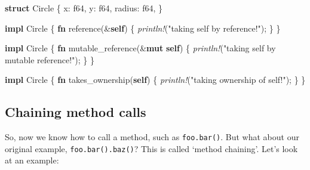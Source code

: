 \documentclass[a4paper,]{book}
\newenvironment{Shaded}{\begin{snugshade}}{\end{snugshade}}
\newcommand{\KeywordTok}[1]{\textcolor[rgb]{0.13,0.29,0.53}{\textbf{{#1}}}}
\newcommand{\DataTypeTok}[1]{\textcolor[rgb]{0.13,0.29,0.53}{{#1}}}
\newcommand{\StringTok}[1]{\textcolor[rgb]{0.31,0.60,0.02}{{#1}}}
\newcommand{\PreprocessorTok}[1]{\textcolor[rgb]{0.56,0.35,0.01}{\textit{{#1}}}}
\newcommand{\NormalTok}[1]{{#1}}
\begin{document}
\begin{Shaded}
\begin{Highlighting}[]
\KeywordTok{struct} \NormalTok{Circle \{}
    \NormalTok{x: }\DataTypeTok{f64}\NormalTok{,}
    \NormalTok{y: }\DataTypeTok{f64}\NormalTok{,}
    \NormalTok{radius: }\DataTypeTok{f64}\NormalTok{,}
\NormalTok{\}}

\KeywordTok{impl} \NormalTok{Circle \{}
    \KeywordTok{fn} \NormalTok{reference(&}\KeywordTok{self}\NormalTok{) \{}
       \PreprocessorTok{println!}\NormalTok{(}\StringTok{"taking self by reference!"}\NormalTok{);}
    \NormalTok{\}}
\NormalTok{\}}

\KeywordTok{impl} \NormalTok{Circle \{}
    \KeywordTok{fn} \NormalTok{mutable_reference(&}\KeywordTok{mut} \KeywordTok{self}\NormalTok{) \{}
       \PreprocessorTok{println!}\NormalTok{(}\StringTok{"taking self by mutable reference!"}\NormalTok{);}
    \NormalTok{\}}
\NormalTok{\}}

\KeywordTok{impl} \NormalTok{Circle \{}
    \KeywordTok{fn} \NormalTok{takes_ownership(}\KeywordTok{self}\NormalTok{) \{}
       \PreprocessorTok{println!}\NormalTok{(}\StringTok{"taking ownership of self!"}\NormalTok{);}
    \NormalTok{\}}
\NormalTok{\}}
\end{Highlighting}
\end{Shaded}

\subsection{Chaining method calls}\label{chaining-method-calls}

So, now we know how to call a method, such as \texttt{foo.bar()}. But
what about our original example, \texttt{foo.bar().baz()}? This is
called `method chaining'. Let's look at an example:
\end{document}
